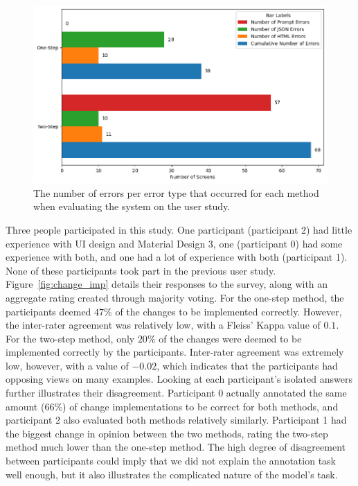 \documentclass[11pt,titlepage,oneside,openany]{book}
\begin{document}
\begin{figure}[t]
	\centering
	\includegraphics[width=\textwidth]{figures/error_counts.png}
	\caption{The number of errors per error type that occurred for each method when evaluating the system on the user study.}
	\label{fig:error_counts}
\end{figure}

\pagebreak 

Three people participated in this study. One participant (participant 2) had little experience with UI design and Material Design 3, one (participant 0) had some experience with both, and one had a lot of experience with both (participant 1). None of these participants took part in the previous user study. Figure~\ref{fig:change_imp} details their responses to the survey, along with an aggregate rating created through majority voting. For the one-step method, the participants deemed $47\%$ of the changes to be implemented correctly. However, the inter-rater agreement was relatively low, with a Fleiss' Kappa value of $0.1$. For the two-step method, only $20\%$ of the changes were deemed to be implemented correctly by the participants. Inter-rater agreement was extremely low, however, with a value of $-0.02$, which indicates that the participants had opposing views on many examples. Looking at each participant's isolated answers further illustrates their disagreement. Participant 0 actually annotated the same amount ($66\%$) of change implementations to be correct for both methods, and participant 2 also evaluated both methods relatively similarly. Participant 1 had the biggest change in opinion between the two methods, rating the two-step method much lower than the one-step method. The high degree of disagreement between participants could imply that we did not explain the annotation task well enough, but it also illustrates the complicated nature of the model's task.
\end{document}
